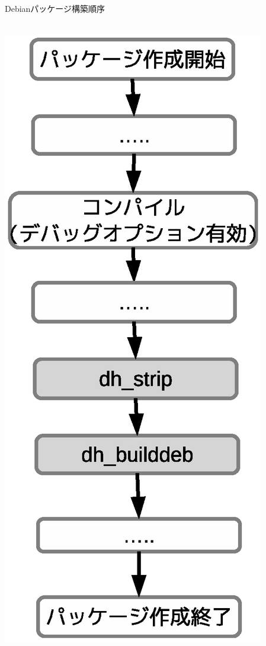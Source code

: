 \begin{frame}{Debianパッケージ構築順序}
\begin{center}
　\\
\includegraphics[width=1.0\hsize]{image2012-gum/ddebug-gum-image-data-flow-only.eps}
\end{center}
\end{frame}

